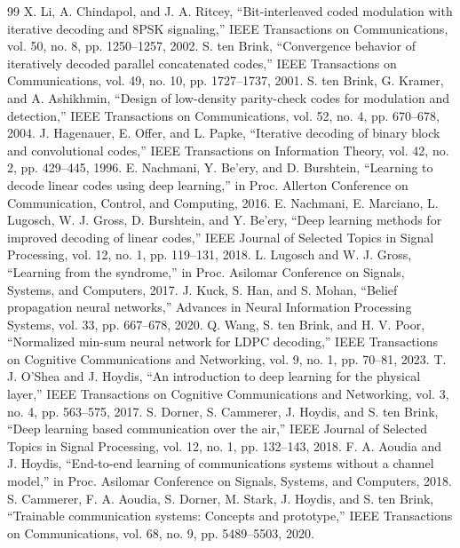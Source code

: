 \begin{thebibliography}{99}
 X. Li, A. Chindapol, and J. A. Ritcey, ``Bit-interleaved coded modulation with iterative decoding and 8PSK signaling,'' IEEE Transactions on Communications, vol. 50, no. 8, pp. 1250--1257, 2002.
 S. ten Brink, ``Convergence behavior of iteratively decoded parallel concatenated codes,'' IEEE Transactions on Communications, vol. 49, no. 10, pp. 1727--1737, 2001.
 S. ten Brink, G. Kramer, and A. Ashikhmin, ``Design of low-density parity-check codes for modulation and detection,'' IEEE Transactions on Communications, vol. 52, no. 4, pp. 670--678, 2004.
 J. Hagenauer, E. Offer, and L. Papke, ``Iterative decoding of binary block and convolutional codes,'' IEEE Transactions on Information Theory, vol. 42, no. 2, pp. 429--445, 1996.
 E. Nachmani, Y. Be'ery, and D. Burshtein, ``Learning to decode linear codes using deep learning,'' in Proc. Allerton Conference on Communication, Control, and Computing, 2016.
 E. Nachmani, E. Marciano, L. Lugosch, W. J. Gross, D. Burshtein, and Y. Be'ery, ``Deep learning methods for improved decoding of linear codes,'' IEEE Journal of Selected Topics in Signal Processing, vol. 12, no. 1, pp. 119--131, 2018.
 L. Lugosch and W. J. Gross, ``Learning from the syndrome,'' in Proc. Asilomar Conference on Signals, Systems, and Computers, 2017.
 J. Kuck, S. Han, and S. Mohan, ``Belief propagation neural networks,'' Advances in Neural Information Processing Systems, vol. 33, pp. 667--678, 2020.
 Q. Wang, S. ten Brink, and H. V. Poor, ``Normalized min-sum neural network for LDPC decoding,'' IEEE Transactions on Cognitive Communications and Networking, vol. 9, no. 1, pp. 70--81, 2023.
 T. J. O'Shea and J. Hoydis, ``An introduction to deep learning for the physical layer,'' IEEE Transactions on Cognitive Communications and Networking, vol. 3, no. 4, pp. 563--575, 2017.
 S. Dorner, S. Cammerer, J. Hoydis, and S. ten Brink, ``Deep learning based communication over the air,'' IEEE Journal of Selected Topics in Signal Processing, vol. 12, no. 1, pp. 132--143, 2018.
 F. A. Aoudia and J. Hoydis, ``End-to-end learning of communications systems without a channel model,'' in Proc. Asilomar Conference on Signals, Systems, and Computers, 2018.
 S. Cammerer, F. A. Aoudia, S. Dorner, M. Stark, J. Hoydis, and S. ten Brink, ``Trainable communication systems: Concepts and prototype,'' IEEE Transactions on Communications, vol. 68, no. 9, pp. 5489--5503, 2020.

\end{thebibliography}
